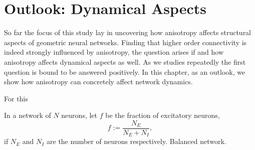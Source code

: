 \chapter{Outlook: Dynamical Aspects}\label{ch:dynamical_aspects}

So far the focus of this study lay in uncovering how anisotropy
affects structural aspects of geometric neural networks. Finding that
higher order connectivity is indeed strongly influenced by anisotropy,
the question arises if and how anisotropy affects dynamical aspects as
well. As we studies repeatedly the first question is bound to be
answered positively. In this chapter, as an outlook, we show how
anisotropy can concretely affect network dynamics.

For this

In a network of $N$ neurons, let $f$ be the fraction of excitatory
neurons,
\[f:= \frac{N_E}{N_E + N_I},
\] if $N_E$ and $N_I$ are the number of neurons respectively.
Balanced network. 















% 
% 














